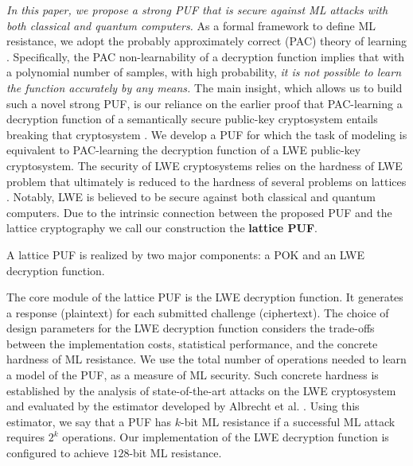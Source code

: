 \emph{In this paper, we propose a strong PUF that is secure against ML attacks with both classical and quantum computers.} \cite{wang2020lattice} 
As a formal framework to define ML resistance, we adopt the probably approximately correct (PAC) theory of learning \cite{mohri2012foundations}. 
Specifically, the PAC non-learnability of a decryption function implies that with a polynomial number of samples, with high probability, \emph{it is not possible to learn the function accurately by any means.}
The main insight, which allows us to build such a novel strong PUF, is our reliance on the earlier proof that PAC-learning a decryption function of a semantically secure public-key cryptosystem entails breaking that cryptosystem %
\cite{kearns1994cryptographic, klivans2006cryptographic}.
We develop a PUF for which the task of modeling is equivalent to PAC-learning the decryption function of a LWE public-key cryptosystem.
The security of LWE cryptosystems relies on the hardness of LWE problem that ultimately is reduced to the hardness of several problems on lattices \cite{regev2009lattices}. 
Notably, LWE is believed to be secure against both classical and quantum computers.
Due to the intrinsic connection between the proposed PUF and the lattice cryptography we call our construction the \textbf{lattice PUF}. 


A lattice PUF is realized by two major components: a POK and an LWE decryption function.

The core module of the lattice PUF is the LWE decryption function. It generates a response (plaintext) for each submitted challenge (ciphertext). The choice of design parameters for the LWE decryption function considers the trade-offs between the implementation costs, statistical performance, and the concrete hardness of ML resistance.
We use the total number of operations needed to learn a model of the PUF, as a measure of ML security. Such concrete hardness is established by the analysis of state-of-the-art attacks on the LWE cryptosystem  \cite{lindner2011better, micciancio2009lattice} and evaluated by the estimator developed by Albrecht et al. \cite{albrecht2015concrete}.
Using this estimator, we say that a PUF has $k$-bit ML resistance if a successful ML attack requires $2^k$ operations. 
Our implementation of the LWE decryption function is configured to achieve $128$-bit ML resistance.

